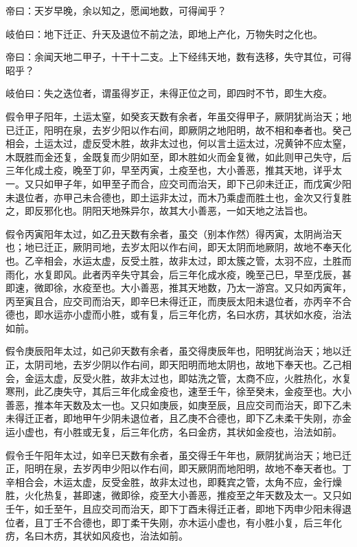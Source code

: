 \documentclass{article}%
\begin{document}
帝曰：天岁早晚，余以知之，愿闻地数，可得闻乎？

岐伯曰：地下迁正、升天及退位不前之法，即地上产化，万物失时之化也。

帝曰：余闻天地二甲子，十干十二支。上下经纬天地，数有迭移，失守其位，可得昭乎？

岐伯曰：失之迭位者，谓虽得岁正，未得正位之司，即四时不节，即生大疫。

假令甲子阳年，土运太窒，如癸亥天数有余者，年虽交得甲子，厥阴犹尚治天；地已迁正，阳明在泉，去岁少阳以作右间，即厥阴之地阳明，故不相和奉者也。癸己相会，土运太过，虚反受木胜，故非太过也，何以言土运太过，况黄钟不应太窒，木既胜而金还复，金既复而少阴如至，即木胜如火而金复微，如此则甲己失守，后三年化成土疫，晚至丁卯，早至丙寅，土疫至也，大小善恶，推其天地，详乎太一。又只如甲子年，如甲至子而合，应交司而治天，即下己卯未迁正，而戊寅少阳未退位者，亦甲己未合德也，即土运非太过，而木乃乘虚而胜土也，金次又行复胜之，即反邪化也。阴阳天地殊异尔，故其大小善恶，一如天地之法旨也。

假令丙寅阳年太过，如乙丑天数有余者，虽交（别本作然）得丙寅，太阴尚治天也；地已迁正，厥阴司地，去岁太阳以作右间，即天太阴而地厥阴，故地不奉天化也。乙辛相会，水运太虚，反受土胜，故非太过，即太簇之管，太羽不应，土胜而雨化，水复即风。此者丙辛失守其会，后三年化成水疫，晚至己巳，早至戊辰，甚即速，微即徐，水疫至也。大小善恶，推其天地数，乃太一游宫。又只如丙寅年，丙至寅且合，应交司而治天，即辛巳未得迁正，而庚辰太阳未退位者，亦丙辛不合德也，即水运亦小虚而小胜，或有复，后三年化疠，名曰水疠，其状如水疫，治法如前。

假令庚辰阳年太过，如己卯天数有余者，虽交得庚辰年也，阳明犹尚治天；地以迁正，太阴司地，去岁少阴以作右间，即天阳明而地太阴也，故地下奉天也。乙己相会，金运太虚，反受火胜，故非太过也，即姑洗之管，太商不应，火胜热化，水复寒刑，此乙庚失守，其后三年化成金疫也，速至壬午，徐至癸未，金疫至也。大小善恶，推本年天数及太一也。又只如庚辰，如庚至辰，且应交司而治天，即下乙未未得迁正者，即地甲午少阴未退位者，且乙庚不合德也，即下乙未柔干失刚，亦金运小虚也，有小胜或无复，后三年化疠，名曰金疠，其状如金疫也，治法如前。

假令壬午阳年太过，如辛巳天数有余者，虽交得壬午年也，厥阴犹尚治天；地已迁正，阳明在泉，去岁丙申少阳以作右间，即天厥阴而地阳明，故地不奉天者也。丁辛相合会，木运太虚，反受金胜，故非太过也，即蕤宾之管，太角不应，金行燥胜，火化热复，甚即速，微即徐，疫至大小善恶，推疫至之年天数及太一。又只如壬午，如壬至午，且应交司而治天，即下丁酉未得迁正者，即地下丙申少阳未得退位者，且丁壬不合德也，即丁柔干失刚，亦木运小虚也，有小胜小复，后三年化疠，名曰木疠，其状如风疫也，治法如前。
\end{document}
